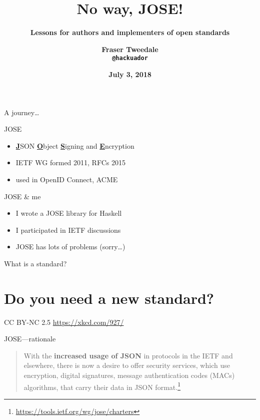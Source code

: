 \documentclass[ignorenonframetext,aspectratio=43]{beamer}
\title{\bf No way, JOSE!}
\subtitle{\bf Lessons for authors and implementers of open standards}
\author{\bf Fraser Tweedale\\
    \texttt{@hackuador}}
\date{\bf July 3, 2018}
\providecommand{\tightlist}{%
  \setlength{\itemsep}{0pt}\setlength{\parskip}{0pt}}
\begin{document}
\begin{frame}
\titlepage
\end{frame}

\begin{frame}[plain]
\begin{center}
\end{center}
\end{frame}

\begin{frame}
\huge
A journey\ldots
\end{frame}

\begin{frame}{JOSE}
\begin{itemize}
\tightlist
\item \underline{\bf J}SON \underline{\bf O}bject
      \underline{\bf S}igning and \underline{\bf E}ncryption
\item IETF WG formed 2011, RFCs 2015
\item used in OpenID Connect, ACME
\end{itemize}
\end{frame}

\begin{frame}{JOSE \& me}
\begin{itemize}
\tightlist
\item I wrote a JOSE library for Haskell
\item I participated in IETF discussions
\item JOSE has lots of problems (sorry\ldots)
\end{itemize}
\end{frame}

\begin{frame}
\huge What is a standard?
\end{frame}



\section{Do you need a new standard?}

\begin{frame}[plain]
\begin{center}
\end{center}
\tiny CC BY-NC 2.5 \url{https://xkcd.com/927/}
\end{frame}

\begin{frame}{JOSE---rationale}
\begin{quotation}
\Large
  With the \textbf{increased usage of JSON} in protocols in the IETF and
  elsewhere, there is now a desire to offer security services, which use
  encryption, digital signatures, message authentication codes (MACs)
  algorithms, that carry their data in JSON format.\footnote[frame]{
    \url{https://tools.ietf.org/wg/jose/charters}}
\end{quotation}

\end{frame}
\end{document}
